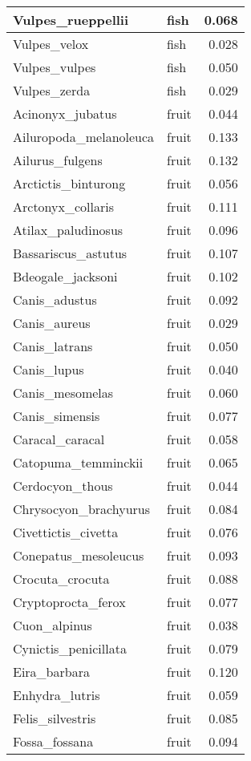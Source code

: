 \begin{table}
\begin{tabular}[t]{l|l|r}
\hline
Vulpes\_rueppellii & fish & 0.068\\
\hline
Vulpes\_velox & fish & 0.028\\
\hline
Vulpes\_vulpes & fish & 0.050\\
\hline
Vulpes\_zerda & fish & 0.029\\
\hline
Acinonyx\_jubatus & fruit & 0.044\\
\hline
Ailuropoda\_melanoleuca & fruit & 0.133\\
\hline
Ailurus\_fulgens & fruit & 0.132\\
\hline
Arctictis\_binturong & fruit & 0.056\\
\hline
Arctonyx\_collaris & fruit & 0.111\\
\hline
Atilax\_paludinosus & fruit & 0.096\\
\hline
Bassariscus\_astutus & fruit & 0.107\\
\hline
Bdeogale\_jacksoni & fruit & 0.102\\
\hline
Canis\_adustus & fruit & 0.092\\
\hline
Canis\_aureus & fruit & 0.029\\
\hline
Canis\_latrans & fruit & 0.050\\
\hline
Canis\_lupus & fruit & 0.040\\
\hline
Canis\_mesomelas & fruit & 0.060\\
\hline
Canis\_simensis & fruit & 0.077\\
\hline
Caracal\_caracal & fruit & 0.058\\
\hline
Catopuma\_temminckii & fruit & 0.065\\
\hline
Cerdocyon\_thous & fruit & 0.044\\
\hline
Chrysocyon\_brachyurus & fruit & 0.084\\
\hline
Civettictis\_civetta & fruit & 0.076\\
\hline
Conepatus\_mesoleucus & fruit & 0.093\\
\hline
Crocuta\_crocuta & fruit & 0.088\\
\hline
Cryptoprocta\_ferox & fruit & 0.077\\
\hline
Cuon\_alpinus & fruit & 0.038\\
\hline
Cynictis\_penicillata & fruit & 0.079\\
\hline
Eira\_barbara & fruit & 0.120\\
\hline
Enhydra\_lutris & fruit & 0.059\\
\hline
Felis\_silvestris & fruit & 0.085\\
\hline
Fossa\_fossana & fruit & 0.094\\

\end{tabular}
\end{table}
